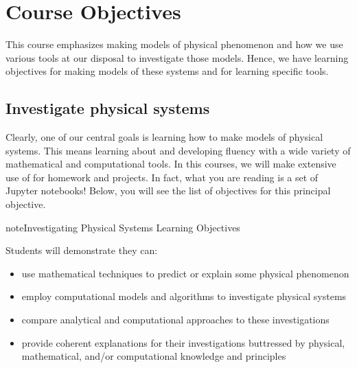 \documentclass[letterpaper,10pt,english]{jupyterBook}
\begin{document}
\sphinxstepscope


\section{Course Objectives}
\label{\detokenize{content/0_course/goals:course-objectives}}\label{\detokenize{content/0_course/goals::doc}}
\sphinxAtStartPar
This course emphasizes making models of physical phenomenon and how we use various tools at our disposal to investigate those models. Hence, we have learning objectives for making models of these systems and for learning specific tools.


\subsection{Investigate physical systems}
\label{\detokenize{content/0_course/goals:investigate-physical-systems}}
\sphinxAtStartPar
Clearly, one of our central goals is learning how to make models of physical systems. This means learning about and developing fluency with a wide variety of mathematical and computational tools. In this courses, we will make extensive use of  for homework and projects. In fact, what you are reading is a set of Jupyter notebooks! Below, you will see the list of objectives for this principal objective.

\begin{sphinxadmonition}{note}{Investigating Physical Systems Learning Objectives}

\sphinxAtStartPar
Students will demonstrate they can:
\begin{itemize}
\item {} 
\sphinxAtStartPar
use mathematical techniques to predict or explain some physical phenomenon

\item {} 
\sphinxAtStartPar
employ computational models and algorithms to investigate physical systems

\item {} 
\sphinxAtStartPar
compare analytical and computational approaches to these investigations

\item {} 
\sphinxAtStartPar
provide coherent explanations for their investigations buttressed by physical, mathematical, and/or computational knowledge and principles

\end{itemize}
\end{sphinxadmonition}
\end{document}
